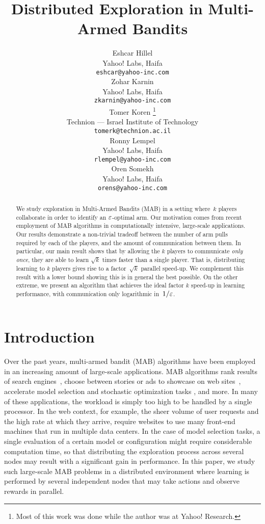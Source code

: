 \documentclass{article} %
\title{Distributed Exploration in Multi-Armed Bandits}
\author{
Eshcar Hillel\\
Yahoo! Labs, Haifa\\
\texttt{eshcar@yahoo-inc.com} \\
\And
Zohar Karnin \\
Yahoo! Labs, Haifa\\
\texttt{zkarnin@yahoo-inc.com} \\
\And
Tomer Koren%
\thanks{Most of this work was done while the author was at Yahoo! Research.} \\
Technion --- Israel Institute of Technology \\
\texttt{tomerk@technion.ac.il} \\
\And
Ronny Lempel \\
Yahoo! Labs, Haifa\\
\texttt{rlempel@yahoo-inc.com} \\
\And
Oren Somekh \\
Yahoo! Labs, Haifa\\
\texttt{orens@yahoo-inc.com} \\
}
\begin{document}
 
\maketitle



\begin{abstract}
We study exploration in Multi-Armed Bandits (MAB) in a setting where~$k$ players collaborate in order to identify an $\varepsilon$-optimal arm.
Our motivation comes from recent employment of MAB algorithms in computationally intensive, large-scale applications.
Our results demonstrate a non-trivial tradeoff between the number of arm pulls required by each of the players, and the amount of communication between them.
In particular, our main result shows that by allowing the $k$ players to communicate \emph{only once}, they are able to learn $\sqrt{k}$ times faster than a single player.
That is, distributing learning to $k$ players gives rise to a factor~$\sqrt{k}$ parallel speed-up.
We complement this result with a lower bound showing this is in general the best possible. 
On the other extreme, we present an algorithm that achieves the ideal factor $k$ speed-up in learning performance, with communication only logarithmic in~$1/\varepsilon$. 
\end{abstract}



%
\vspace{-1ex}
\section{Introduction}
\label{sec:intro}
\vspace{-1ex}

Over the past years, multi-armed bandit (MAB) algorithms have been employed in an increasing amount of large-scale applications.
MAB algorithms rank results of search engines~\citep{InterleavedBuckets, Dueling2009}, choose between stories or ads to showcase on web sites~\citep{COKE2008,COKE-mortal2008}, accelerate model selection and stochastic optimization tasks \citep{maron1994hoeffding,mnih2008empirical}, and more.
In many of these applications, the workload is simply too high to be handled by a single processor.
In the web context, for example, the sheer volume of user requests and the high rate at which they arrive, require websites to use many front-end machines that run in multiple data centers.
In the case of model selection tasks, a single evaluation of a certain model or configuration might require considerable computation time, so that distributing the exploration process across several nodes may result with a significant gain in performance. 
In this paper, we study such large-scale MAB problems in a distributed environment where 
learning is performed by several independent nodes that may take actions and observe rewards in parallel.
\end{document}
